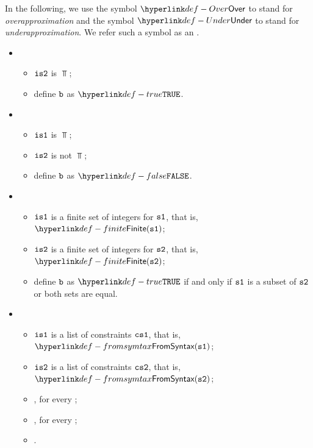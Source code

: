 \hypertarget{def-Under}{}
\hypertarget{def-Over}{}
\hypertarget{def-approximationdirectionterm}{}
In the following, we use the symbol $\Over$ to stand for \emph{overapproximation}
and the symbol $\Under$ to stand for \emph{underapproximation}.
We refer such a symbol as an \approximationdirectionterm.

\ProseParagraph
\OneApplies
\begin{itemize}
  \item {}
  \begin{itemize}
    \item $\texttt{is2}$ is $\Top$;
    \item define $\texttt{b}$ as $\True$.
  \end{itemize}

  \item {}
  \begin{itemize}
    \item $\texttt{is1}$ is $\Top$;
    \item $\texttt{is2}$ is not $\Top$;
    \item define $\texttt{b}$ as $\False$.
  \end{itemize}

  \item {}
  \begin{itemize}
    \item $\texttt{is1}$ is a finite set of integers for $\texttt{s1}$, that is, $\Finite(\vsone)$;
    \item $\texttt{is2}$ is a finite set of integers for $\texttt{s2}$, that is, $\Finite(\vstwo)$;
    \item define $\texttt{b}$ as $\True$ if and only if $\texttt{s1}$ is a subset of $\texttt{s2}$ or both sets are equal.
  \end{itemize}

  \item {}
  \begin{itemize}
    \item $\texttt{is1}$ is a list of constraints $\csone$, that is, $\FromSyntax(\vsone)$;
    \item $\texttt{is2}$ is a list of constraints $\cstwo$, that is, $\FromSyntax(\vstwo)$;
    \item \Proseapproxconstraint{$\tenv$}{$\csone[\vi]$}{$\Over$}{$\vsone_\vi$}, for every \Proselistrange{$\vi$}{$\csone$};
    \item \Proseapproxconstraint{$\tenv$}{$\cstwo[\vj]$}{$\Under$}{$\vstwo_\vj$}, for every \Proselistrange{$\vj$}{$\cstwo$};
    \item {}.
  \end{itemize}


\end{itemize}
